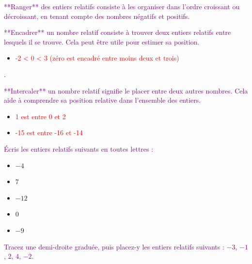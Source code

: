 \documentclass{article}
\begin{document}
\textcolor{purple}{**Ranger** des entiers relatifs consiste à les organiser dans l'ordre croissant ou décroissant, en tenant compte des nombres négatifs et positifs.}

\vspace{0.35cm}

\textcolor{purple}{**Encadrer** un nombre relatif consiste à trouver deux entiers relatifs entre lesquels il se trouve. Cela peut être utile pour estimer sa position.}

\vspace{0.4cm}

\begin{tcolorbox}[colback=orange!10!white, colframe=orange!75!black, title=\textcolor{white}{Exemples}, sharp corners=southwest]

\begin{itemize}
    \item \textcolor{red}{-2 < 0 < 3 (zéro est encadré entre moins deux et trois)}
\end{itemize}.
\end{tcolorbox}

\textcolor{purple}{**Intercaler** un nombre relatif signifie le placer entre deux autres nombres. Cela aide à comprendre sa position relative dans l'ensemble des entiers.}

\vspace{0.4cm}

\begin{tcolorbox}[colback=orange!10!white, colframe=orange!75!black, title=\textcolor{white}{Exemples}, sharp corners=southwest]

\begin{itemize}
    \item \textcolor{red}{1 est entre 0 et 2}
    \item \textcolor{red}{-15 est entre -16 et -14}
\end{itemize}
\end{tcolorbox}

\begin{tcolorbox}[colback=yellow!10!white, colframe=yellow!80!black, title=\textcolor{white}{Application directe}, sharp corners=southwest]

\textcolor{purple}{
Écris les entiers relatifs suivants en toutes lettres :
}
\begin{itemize}
    \item $-4$
    \item $7$
    \item $-12$
    \item $0$
    \item $-9$
\end{itemize}

\vspace{0.4cm}

\textcolor{purple}{
Tracez une demi-droite graduée, puis placez-y les entiers relatifs suivants : $-3$, $-1$, $2$, $4$, $-2$.
}


\end{tcolorbox}
\end{document}

